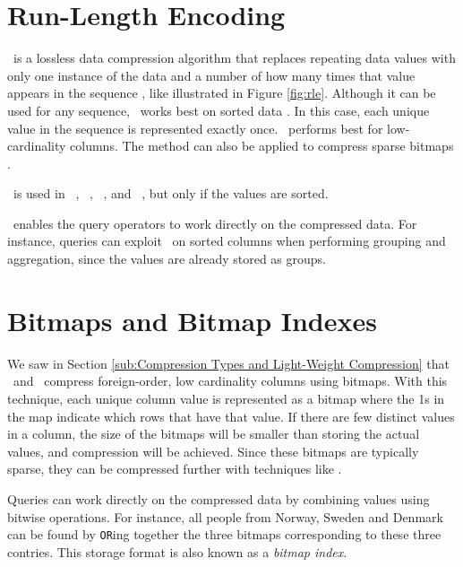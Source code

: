 \section{Run-Length Encoding}
\label{sec:Run-Length Encoding}

\rle~is a lossless data compression algorithm that replaces repeating data values with only one instance of the data and a number of how many times that value appears in the sequence \cite{Stoimen_undated-js}, like illustrated in Figure \ref{fig:rle}. Although it can be used for any sequence, \rle~works best on sorted data \cite{Bjorklund2011-wh, Holloway2008-rr}. In this case, each unique value in the sequence is represented exactly once. \rle~performs best for low-cardinality columns. The method can also be applied to compress sparse bitmaps \cite{Stonebraker2005-qz}.

\rle~is used in \cstore~\cite{Stonebraker2005-qz}, \vertica~\cite{Lamb2012-kg}, \oracle~\cite{Oracle2015-fs}, and \sapnw~\cite{Lemke2010-is}, but only if the values are sorted. 

\rle~enables the query operators to work directly on the compressed data. For instance, queries can exploit \rle~on sorted columns when performing grouping and aggregation, since the values are already stored as groups. 

\section{Bitmaps and Bitmap Indexes}
\label{sec:Bitmaps and Bitmap Indexes}
We saw in Section \ref{sub:Compression Types and Light-Weight Compression} that \cstore~and \vertica~compress foreign-order, low cardinality columns using bitmaps. With this technique, each unique column value is represented as a bitmap where the 1s in the map indicate which rows that have that value. If there are few distinct values in a column, the size of the bitmaps will be smaller than storing the actual values, and compression will be achieved. Since these bitmaps are typically sparse, they can be compressed further with techniques like \rle.

Queries can work directly on the compressed data by combining values using bitwise operations. For instance, all people from Norway, Sweden and Denmark can be found by \texttt{OR}ing together the three bitmaps corresponding to these three contries. This storage format is also known as a \textit{bitmap index}.

